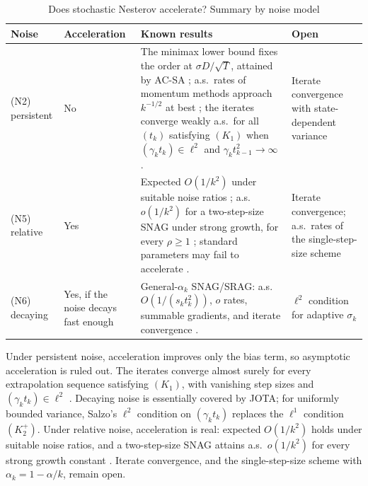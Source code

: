 \documentclass[11pt]{article}
\begin{document}
\begin{table}[htbp]
\centering
\small
\renewcommand{\arraystretch}{1.3}
\caption{Does stochastic Nesterov accelerate? Summary by noise model}
\label{tab:lines}
\begin{tabularx}{\textwidth}{@{}p{2.3cm}p{2.4cm}Yp{3.2cm}@{}}
\toprule
Noise & Acceleration & Known results & Open \\
\midrule
(N2) persistent & No & The minimax lower bound fixes the order at $\sigma D/\sqrt T$, attained by AC-SA \citep{nemirovski1983,agarwal2012,lan2012}; a.s.\ rates of momentum methods approach $k^{-1/2}$ at best \citep{sebbouh2021,liu2022,attouch2026ravine}; the iterates converge weakly a.s.\ for all $(t_k)$ satisfying $(K_1)$ when $(\gamma_kt_k)\in\ell^2$ and $\gamma_kt_{k-1}^2\to\infty$ \citep{salzo2025iterates}. & Iterate convergence with state-dependent variance \\
\addlinespace
(N5) relative & Yes & Expected $O(1/k^2)$ under suitable noise ratios \citep{vaswani2019fast,gupta2024nesterov,mishkin2024faster}; a.s.\ $o(1/k^2)$ for a two-step-size SNAG under strong growth, for every $\rho\ge1$ \citep{hermant2025gradient}; standard parameters may fail to accelerate \citep{kidambi2018insufficiency,liu2020accelerating}. & Iterate convergence; a.s.\ rates of the single-step-size scheme \\
\addlinespace
(N6) decaying & Yes, if the noise decays fast enough & General-$\alpha_k$ SNAG/SRAG: a.s.\ $O(1/(s_kt_k^2))$, $o$ rates, summable gradients, and iterate convergence \citep{attouch2026ravine,salzo2025iterates}. & $\ell^2$ condition for adaptive $\sigma_k$ \\
\bottomrule
\end{tabularx}
\end{table}

Under persistent noise, acceleration improves only the bias term, so asymptotic acceleration is ruled out. The iterates converge almost surely for every extrapolation sequence satisfying $(K_1)$, with vanishing step sizes and $(\gamma_kt_k)\in\ell^2$ \citep{salzo2025iterates}. Decaying noise is essentially covered by JOTA; for uniformly bounded variance, Salzo's $\ell^2$ condition on $(\gamma_kt_k)$ replaces the $\ell^1$ condition $(K_2^+)$. Under relative noise, acceleration is real: expected $O(1/k^2)$ holds under suitable noise ratios, and a two-step-size SNAG attains a.s.\ $o(1/k^2)$ for every strong growth constant \citep{hermant2025gradient}. Iterate convergence, and the single-step-size scheme with $\alpha_k=1-\alpha/k$, remain open.
\end{document}
